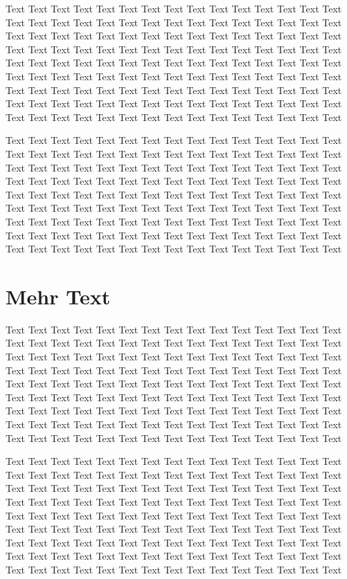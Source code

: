 Text Text Text Text Text Text Text Text Text Text Text Text Text Text Text 
Text Text Text Text Text Text Text Text Text Text Text Text Text Text Text 
Text Text Text Text Text Text Text Text Text Text Text Text Text Text Text 
Text Text Text Text Text Text Text Text Text Text Text Text Text Text Text 
Text Text Text Text Text Text Text Text Text Text Text Text Text Text Text 
Text Text Text Text Text Text Text Text Text Text Text Text Text Text Text 
Text Text Text Text Text Text Text Text Text Text Text Text Text Text Text 
Text Text Text Text Text Text Text Text Text Text Text Text Text Text Text 
Text Text Text Text Text Text Text Text Text Text Text Text Text Text Text 

Text Text Text Text Text Text Text Text Text Text Text Text Text Text Text 
Text Text Text Text Text Text Text Text Text Text Text Text Text Text Text 
Text Text Text Text Text Text Text Text Text Text Text Text Text Text Text 
Text Text Text Text Text Text Text Text Text Text Text Text Text Text Text 
Text Text Text Text Text Text Text Text Text Text Text Text Text Text Text 
Text Text Text Text Text Text Text Text Text Text Text Text Text Text Text 
Text Text Text Text Text Text Text Text Text Text Text Text Text Text Text 
Text Text Text Text Text Text Text Text Text Text Text Text Text Text Text 
Text Text Text Text Text Text Text Text Text Text Text Text Text Text Text 

\section{Mehr Text}

Text Text Text Text Text Text Text Text Text Text Text Text Text Text Text 
Text Text Text Text Text Text Text Text Text Text Text Text Text Text Text 
Text Text Text Text Text Text Text Text Text Text Text Text Text Text Text 
Text Text Text Text Text Text Text Text Text Text Text Text Text Text Text 
Text Text Text Text Text Text Text Text Text Text Text Text Text Text Text 
Text Text Text Text Text Text Text Text Text Text Text Text Text Text Text 
Text Text Text Text Text Text Text Text Text Text Text Text Text Text Text 
Text Text Text Text Text Text Text Text Text Text Text Text Text Text Text 
Text Text Text Text Text Text Text Text Text Text Text Text Text Text Text 

Text Text Text Text Text Text Text Text Text Text Text Text Text Text Text 
Text Text Text Text Text Text Text Text Text Text Text Text Text Text Text 
Text Text Text Text Text Text Text Text Text Text Text Text Text Text Text 
Text Text Text Text Text Text Text Text Text Text Text Text Text Text Text 
Text Text Text Text Text Text Text Text Text Text Text Text Text Text Text 
Text Text Text Text Text Text Text Text Text Text Text Text Text Text Text 
Text Text Text Text Text Text Text Text Text Text Text Text Text Text Text 
Text Text Text Text Text Text Text Text Text Text Text Text Text Text Text 
Text Text Text Text Text Text Text Text Text Text Text Text Text Text Text 

